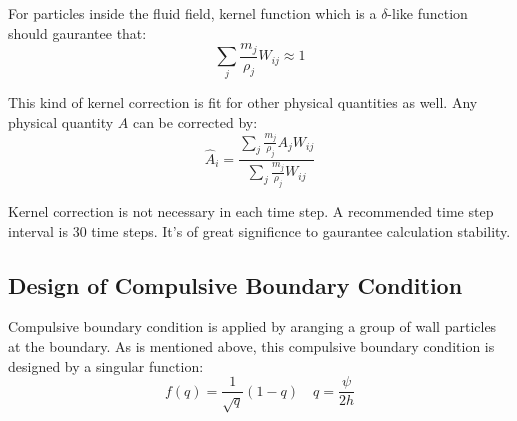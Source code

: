 For particles inside the fluid field,
kernel function which is a $\delta$-like function should gaurantee that:
\begin{equation}
    \sum_j \frac{m_j}{\rho_j} W_{ij} \approx 1
\end{equation}

This kind of kernel correction is fit for other physical quantities as well.
Any physical quantity $A$ can be corrected by:
\begin{equation}
    \hat{A}_i = \frac{
        \sum_j \frac{m_j}{\rho_j} A_j W_{ij}
    }{
        \sum_j \frac{m_j}{\rho_j} W_{ij}
    }
\end{equation}

Kernel correction is not necessary in each time step. 
A recommended time step interval is 30 time steps.
It's of great significnce to gaurantee calculation stability.

\subsection{Design of Compulsive Boundary Condition}

Compulsive boundary condition is applied by aranging a group of wall 
particles at the boundary.
As is mentioned above,
this compulsive boundary condition is designed by a singular function:
\begin{equation}
    f(q) = \frac{1}{\sqrt{q}}(1-q) \quad q=\frac{\psi}{2h}
\end{equation}

\begin{figure}[H]
    \centering
\end{figure}

